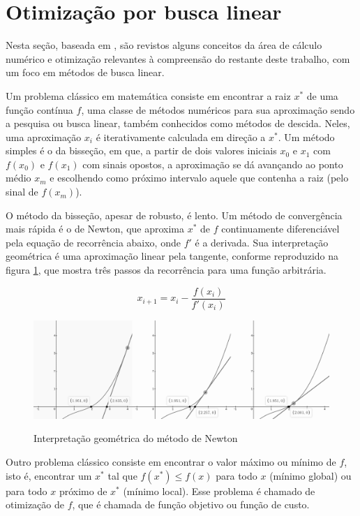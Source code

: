 \documentclass[cic,tc]{iiufrgs}
\begin{document}
\section{Otimização por busca linear}
\label{sec:bfgs}

Nesta seção, baseada em \cite{nocedal2006numerical}, são revistos alguns
conceitos da área de cálculo numérico e otimização relevantes à compreensão do
restante deste trabalho, com um foco em métodos de busca linear.

Um problema clássico em matemática consiste em encontrar a raiz $x^*$ de uma
função contínua $f$, uma classe de métodos numéricos para sua aproximação sendo
a pesquisa ou busca linear, também conhecidos como métodos de descida. Neles,
uma aproximação $x_i$ é iterativamente calculada em direção a $x^*$. Um método
simples é o da bisseção, em que, a partir de dois valores iniciais $x_0$ e
$x_1$ com $f(x_0)$ e $f(x_1)$ com sinais opostos, a aproximação se dá avançando
ao ponto médio $x_m$ e escolhendo como próximo intervalo aquele que contenha a
raiz (pelo sinal de $f(x_m)$).

O método da bisseção, apesar de robusto, é lento. Um método de convergência
mais rápida é o de Newton, que aproxima $x^*$ de $f$ continuamente diferenciável
pela equação de recorrência abaixo, onde $f'$ é a derivada. Sua interpretação
geométrica é uma aproximação linear pela tangente, conforme reproduzido na
figura \ref{fig:tan}, que mostra três passos da recorrência para uma função
arbitrária. 

$$ x_{i + 1} = x_i - \frac{f(x_i)}{f'(x_i)} $$

\begin{figure} \caption{Interpretação geométrica do método de Newton} \begin{center}
\includegraphics[width=0.8\linewidth]{img/tan.png} \end{center}
 \label{fig:tan} \end{figure}

Outro problema clássico consiste em encontrar o valor máximo ou mínimo de $f$,
isto é, encontrar um $x^*$ tal que $f(x^*) \le f(x)$ para todo $x$ (mínimo
global) ou para todo $x$ próximo de $x^*$ (mínimo local). Esse problema é
chamado de otimização de $f$, que é chamada de função objetivo ou função de
custo. 
\end{document}
